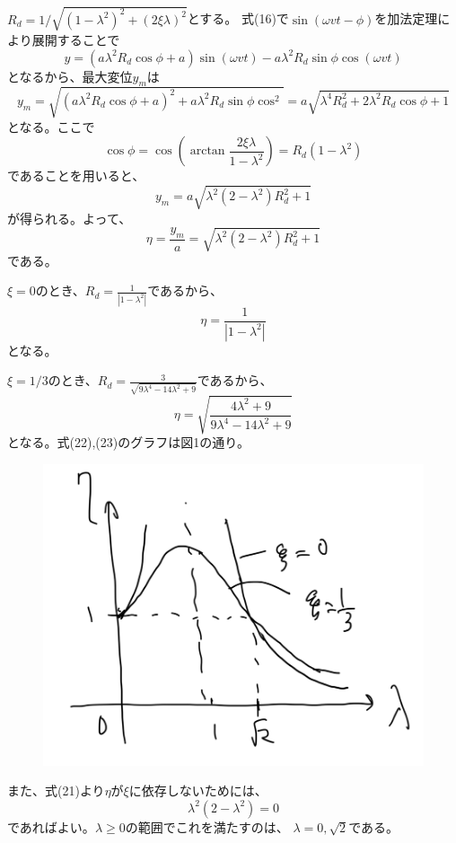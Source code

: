 \documentclass[a4paper]{jsarticle}
\begin{document}
\subsection{}
$R_d = 1/\sqrt{(1 - \lambda^2)^2 + (2 \xi \lambda)^2}$とする。
式(16)で$\sin (\omega v t - \phi)$を加法定理により展開することで
\begin{equation}
  y = (a \lambda^2 R_d \cos \phi + a) \sin (\omega v t)
  - a \lambda^2 R_d \sin \phi \cos (\omega v t)
\end{equation}
となるから、最大変位$y_m$は
\begin{equation}
  y_m = \sqrt{(a \lambda^2 R_d \cos \phi + a)^2
  + a \lambda^2 R_d \sin \phi \cos^2}
  = a \sqrt{\lambda^4 R_d^2 + 2 \lambda^2 R_d \cos \phi + 1}
\end{equation}
となる。ここで
\begin{equation}
  \cos \phi = \cos \left(\arctan \frac{2 \xi \lambda}{1 - \lambda^2}\right)
  = R_d (1 - \lambda^2)
\end{equation}
であることを用いると、
\begin{equation}
  y_m = a \sqrt{\lambda^2 (2 - \lambda^2) R_d^2 + 1}
\end{equation}
が得られる。よって、
\begin{equation}
  \eta = \frac{y_m}{a} = \sqrt{\lambda^2 (2 - \lambda^2) R_d^2 + 1}
\end{equation}
である。\par
$\xi = 0$のとき、$R_d = \frac{1}{|1 - \lambda^2|}$であるから、
\begin{equation}
  \eta = \frac{1}{|1 - \lambda^2|}
\end{equation}
となる。\par
$\xi = 1/3$のとき、$R_d = \frac{3}{\sqrt{9 \lambda^4 - 14 \lambda^2 + 9}}$であるから、
\begin{equation}
  \eta = \sqrt{\frac{4 \lambda^2 + 9}{9 \lambda^4 - 14 \lambda^2 + 9}}
\end{equation}
となる。式(22),(23)のグラフは図1の通り。\par
\begin{figure}[htb]
  \centering
  \includegraphics[width=0.3\hsize]{fig1.png}
\end{figure}
また、式(21)より$\eta$が$\xi$に依存しないためには、
\begin{equation}
  \lambda^2 (2 - \lambda^2) = 0
\end{equation}
であればよい。$\lambda \geq 0$の範囲でこれを満たすのは、
$\lambda = 0, \sqrt{2}$である。
\end{document}
